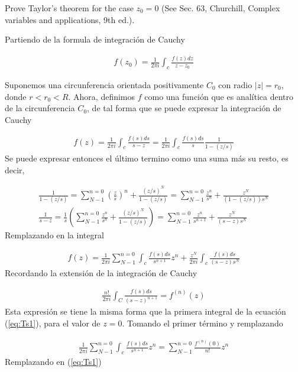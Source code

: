 \begin{problem}{8}
    Prove Taylor’s theorem for the case $z_0 = 0$ (See Sec. 63, Churchill,
    Complex variables and applications, 9th ed.).
\end{problem}

Partiendo de la formula de integración de Cauchy

\begin{gather}
    f(z_0) = \frac{1}{2\pi i}\int_c \frac{f(z)dz}{z-z_0}
\end{gather}

Suponemos una circunferencia orientada positivamente $C_0$ con radio $|z| = r_0$, donde $r < r_0 < R$. Ahora, definimos $f$ como una función que es analítica dentro de la circunferencia $C_0$, de tal forma que se puede expresar la integración de Cauchy 

\begin{gather*}
    f(z) = \frac{1}{2\pi i}\int_c \frac{f(s)ds}{s-z} = \frac{1}{2\pi i}\int_c \frac{f(s)ds}{s}\frac{1}{1-(z/s)} 
\end{gather*}
Se puede expresar entonces el último termino como una suma más su resto, es decir,

\begin{gather*}
    \frac{1}{1-(z/s)} = \sum_{N-1}^{n = 0}\left(\frac{z}{s}\right)^n + \frac{(z/s)^N}{1-(z/s)} = \sum_{N-1}^{n = 0}\frac{z^n}{s^n} + \frac{z^N}{(1-(z/s))s^{N}}\\
    \frac{1}{s-z} = \frac{1}{s}\left(\sum_{N-1}^{n = 0}\frac{z^n}{s^n} + \frac{(z/s)^N}{1-(z/s)}\right) = \sum_{N-1}^{n = 0}\frac{z^n}{s^{n+1}} + \frac{z^N}{(s-z)s^N}
\end{gather*}
Remplazando en la integral 

\begin{gather}
    \label{eq:Ts1}f(z) = \frac{1}{2\pi i} \sum_{N-1}^{n = 0} \int_c\frac{f(s)ds}{s^{n+1}}z^n + \frac{z^N}{2\pi i}\int_c \frac{f(s)ds}{(s-z)s^N}
\end{gather}
Recordando la extensión de la integración de Cauchy

\begin{gather*}
    \frac{n!}{2\pi i}\int_{C} \frac{f(s)ds}{(s-z)^{n+1}} = f^{(n)}(z)
\end{gather*}
Esta expresión se tiene la misma forma que la primera integral de la ecuación (\ref*{eq:Ts1}), para el valor de $z=0$. Tomando el primer término y remplazando

\begin{gather*}
    \frac{1}{2\pi i} \sum_{N-1}^{n = 0} \int_c\frac{f(s)ds}{s^{n+1}}z^n = \sum_{N-1}^{n = 0} \frac{f^{(n)}(0)}{n!} z^n
\end{gather*}
Remplazando en (\ref*{eq:Ts1})

